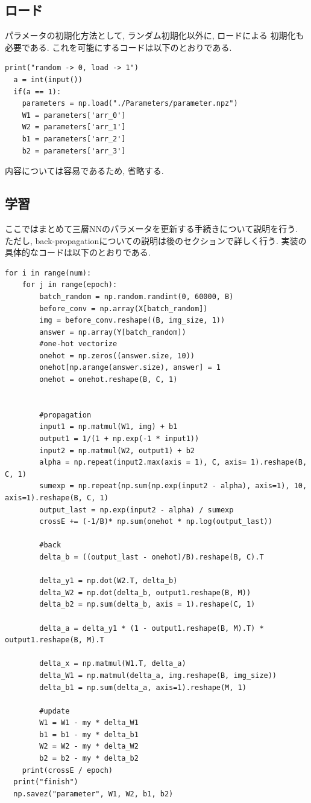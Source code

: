 \documentclass[a4paper,11pt]{jsarticle}
\begin{document}
\subsection*{ロード}
パラメータの初期化方法として, ランダム初期化以外に, ロードによる
初期化も必要である. これを可能にするコードは以下のとおりである.
\begin{lstlisting}[caption = load]
  print("random -> 0, load -> 1")
  a = int(input())
  if(a == 1):
    parameters = np.load("./Parameters/parameter.npz")
    W1 = parameters['arr_0']
    W2 = parameters['arr_1']
    b1 = parameters['arr_2']
    b2 = parameters['arr_3']
\end{lstlisting}
内容については容易であるため, 省略する.

\subsection*{学習}
ここではまとめて三層NNのパラメータを更新する手続きについて説明を行う.
ただし, back-propagationについての説明は後のセクションで詳しく行う.
実装の具体的なコードは以下のとおりである.
\begin{lstlisting}[caption=3NN]
  for i in range(num):
    for j in range(epoch):
        batch_random = np.random.randint(0, 60000, B)       
        before_conv = np.array(X[batch_random])
        img = before_conv.reshape((B, img_size, 1))
        answer = np.array(Y[batch_random])
        #one-hot vectorize
        onehot = np.zeros((answer.size, 10))
        onehot[np.arange(answer.size), answer] = 1
        onehot = onehot.reshape(B, C, 1)
        

        #propagation
        input1 = np.matmul(W1, img) + b1
        output1 = 1/(1 + np.exp(-1 * input1))
        input2 = np.matmul(W2, output1) + b2
        alpha = np.repeat(input2.max(axis = 1), C, axis= 1).reshape(B, C, 1)
        sumexp = np.repeat(np.sum(np.exp(input2 - alpha), axis=1), 10, axis=1).reshape(B, C, 1)
        output_last = np.exp(input2 - alpha) / sumexp
        crossE += (-1/B)* np.sum(onehot * np.log(output_last))

        #back
        delta_b = ((output_last - onehot)/B).reshape(B, C).T

        delta_y1 = np.dot(W2.T, delta_b)
        delta_W2 = np.dot(delta_b, output1.reshape(B, M))
        delta_b2 = np.sum(delta_b, axis = 1).reshape(C, 1)

        delta_a = delta_y1 * (1 - output1.reshape(B, M).T) * output1.reshape(B, M).T

        delta_x = np.matmul(W1.T, delta_a)
        delta_W1 = np.matmul(delta_a, img.reshape(B, img_size))
        delta_b1 = np.sum(delta_a, axis=1).reshape(M, 1)

        #update
        W1 = W1 - my * delta_W1
        b1 = b1 - my * delta_b1
        W2 = W2 - my * delta_W2
        b2 = b2 - my * delta_b2
    print(crossE / epoch)
  print("finish")
  np.savez("parameter", W1, W2, b1, b2)
\end{lstlisting}
\end{document}
